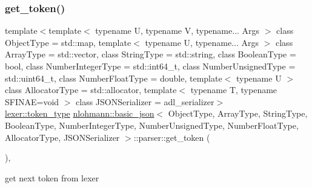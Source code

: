 \subsubsection{\texorpdfstring{get\+\_\+token()}{get\_token()}}
{\footnotesize\ttfamily template$<$template$<$ typename U, typename V, typename... Args $>$ class Object\+Type = std\+::map, template$<$ typename U, typename... Args $>$ class Array\+Type = std\+::vector, class String\+Type  = std\+::string, class Boolean\+Type  = bool, class Number\+Integer\+Type  = std\+::int64\+\_\+t, class Number\+Unsigned\+Type  = std\+::uint64\+\_\+t, class Number\+Float\+Type  = double, template$<$ typename U $>$ class Allocator\+Type = std\+::allocator, template$<$ typename T, typename S\+F\+I\+N\+A\+E=void $>$ class J\+S\+O\+N\+Serializer = adl\+\_\+serializer$>$ \\
\hyperlink{classnlohmann_1_1basic__json_1_1lexer_a96887d6cd131e3d3a85a9d71fbdbcdf7}{lexer\+::token\+\_\+type} \hyperlink{classnlohmann_1_1basic__json}{nlohmann\+::basic\+\_\+json}$<$ Object\+Type, Array\+Type, String\+Type, Boolean\+Type, Number\+Integer\+Type, Number\+Unsigned\+Type, Number\+Float\+Type, Allocator\+Type, J\+S\+O\+N\+Serializer $>$\+::parser\+::get\+\_\+token (\begin{DoxyParamCaption}{ }\end{DoxyParamCaption})\hspace{0.3cm}{\ttfamily [inline]}, {\ttfamily [private]}}



get next token from lexer 

\mbox{\label{classnlohmann_1_1basic__json_1_1parser_ad93c24f1a1b0ac2f557e6ea34deffd63}} 

